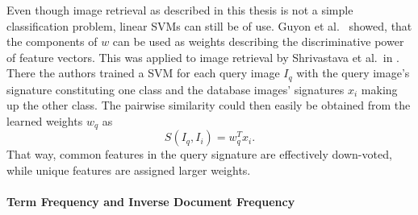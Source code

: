 Even though image retrieval as described in this thesis is not a simple
classification problem, linear SVMs can still be of use. Guyon et al.\
\autocite{guyon_gene_2002} showed, that the components of $w$ can be used as
weights describing the discriminative power of feature vectors. This was
applied to image retrieval by Shrivastava et al.\ in
\autocite{shrivastava_data-driven_2011}. There the authors trained a SVM for
each query image $I_q$ with the query image's signature constituting one class
and the database images' signatures $x_i$ making up the other class. The
pairwise similarity could then easily be obtained from the learned weights
$w_q$ as
\begin{equation*}
    S(I_q, I_i) = w_q^T x_i.
\end{equation*}
That way, common features in the query signature are effectively down-voted,
while unique features are assigned larger weights.

\paragraph{Term Frequency and Inverse Document Frequency}
